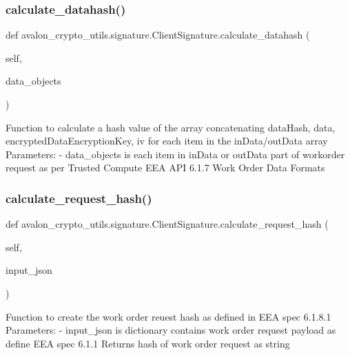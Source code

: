 \subsubsection{\texorpdfstring{calculate\+\_\+datahash()}{calculate\_datahash()}}
{\footnotesize\ttfamily def avalon\+\_\+crypto\+\_\+utils.\+signature.\+Client\+Signature.\+calculate\+\_\+datahash (\begin{DoxyParamCaption}\item[{}]{self,  }\item[{}]{data\+\_\+objects }\end{DoxyParamCaption})}

\begin{DoxyVerb}Function to calculate a hash value of the array concatenating dataHash,
data, encryptedDataEncryptionKey, iv for each item in the
inData/outData array
Parameters:
    - data_objects is each item in inData or outData part of workorder
      request as per Trusted Compute EEA API 6.1.7
      Work Order Data Formats
\end{DoxyVerb}
 \mbox{\label{classavalon__crypto__utils_1_1signature_1_1ClientSignature_a30a724087019727c3b9418566f246ff2}} 
\subsubsection{\texorpdfstring{calculate\+\_\+request\+\_\+hash()}{calculate\_request\_hash()}}
{\footnotesize\ttfamily def avalon\+\_\+crypto\+\_\+utils.\+signature.\+Client\+Signature.\+calculate\+\_\+request\+\_\+hash (\begin{DoxyParamCaption}\item[{}]{self,  }\item[{}]{input\+\_\+json }\end{DoxyParamCaption})}

\begin{DoxyVerb}Function to create the work order reuest hash
as defined in EEA spec 6.1.8.1
Parameters:
    - input_json is dictionary contains work order request payload
      as define EEA spec 6.1.1
Returns hash of work order request as string
\end{DoxyVerb}
 \mbox{\label{classavalon__crypto__utils_1_1signature_1_1ClientSignature_a7b2f9bc1089a8b2ca364483d0dc4733b}} 
